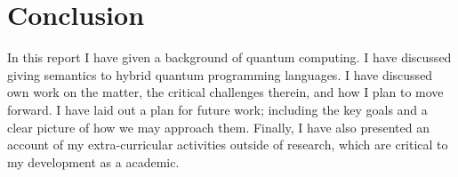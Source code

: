 \section{Conclusion} \label{conclusion}

In this report I have given a background of quantum computing.
% 
I have discussed giving semantics to hybrid quantum programming languages.
% 
I have discussed own work on the matter, the critical challenges therein, and how I plan to move forward.
% 
I have laid out a plan for future work; including the key goals
and a clear picture of how we may approach them.
% 
Finally, I have also presented an account of my extra-curricular 
activities outside of research, which are critical to my development
as a academic.